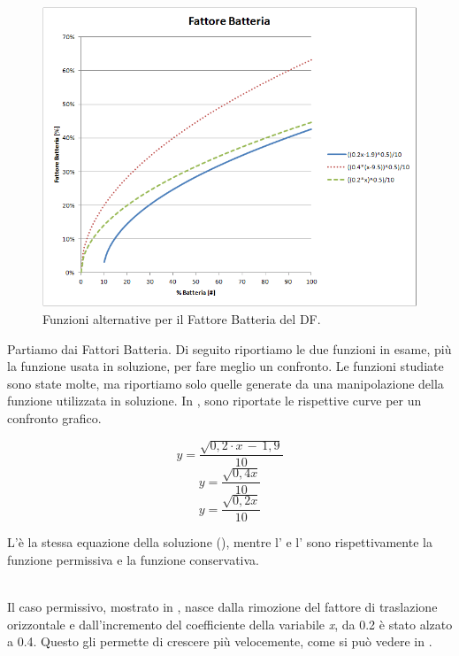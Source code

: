 \begin{figure}[t]
	\centering
	\includegraphics[width=0.9\linewidth]{Images/grafici_usati/DF_battery_factor_perm_conserv}
	\caption[Fattore Batteria alternative del DF]{Funzioni alternative per il Fattore Batteria del DF.}
	\label{fig:DF_battery_factor_perm_conserv}
\end{figure}
\bigskip

Partiamo dai Fattori Batteria. Di seguito riportiamo le due funzioni in esame, più la funzione usata in soluzione, per fare meglio un confronto. Le funzioni studiate sono state molte, ma riportiamo solo quelle generate da una manipolazione della funzione utilizzata in soluzione. In , sono riportate le rispettive curve per un confronto grafico.

\begin{equation}
	\label{eq:df_bis_bat_sol}
	y=\dfrac{\sqrt{0,2\cdot x\,-\,1,9}}{10}
\end{equation}
\begin{equation}
	\label{eq:df_bis_bat_perm}
	y=\dfrac{\sqrt{0,4x}}{10}
\end{equation}
\begin{equation}
	\label{eq:df_bis_bat_cons}
	y=\dfrac{\sqrt{0,2x}}{10}
\end{equation}

L'è la stessa equazione della soluzione (), mentre l' e l' sono rispettivamente la funzione permissiva e la funzione conservativa.
\bigskip


\\
Il caso permissivo, mostrato in , nasce dalla rimozione del fattore di traslazione orizzontale e dall'incremento del coefficiente della variabile \textit{x}, da 0.2 è stato alzato a 0.4. Questo gli permette di crescere più velocemente, come si può vedere in .
\medskip

